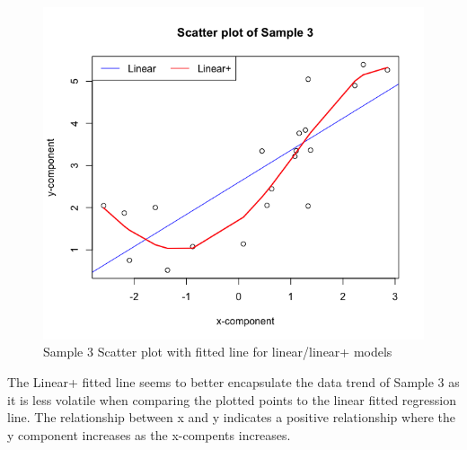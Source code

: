 \documentclass{article}
\begin{document}
\begin{figure}[!htb]
\caption{Sample 3 Scatter plot with fitted line for linear/linear+ models}
\label{returns_microsoft}
\begin{center}
\includegraphics[scale=0.8]{sample3.png}
\end{center}
\end{figure}
The Linear+ fitted line seems to better encapsulate the data trend of Sample 3 as it is less volatile when comparing the plotted points to the linear fitted regression line. The relationship between x and y indicates a positive relationship where the y component increases as the x-compents increases.
\newpage
\end{document}
